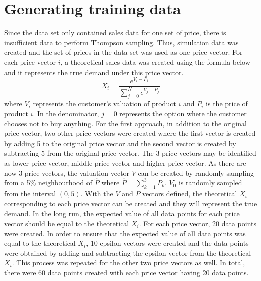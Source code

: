 \documentclass[a4paper]{article}
\begin{document}
\section{Generating training data}
\label{sec:theory}
Since the data set only contained sales data for one set of price, there is insufficient data to perform Thompson sampling. Thus, simulation data was created and the set of prices in the data set was used as one price vector. 
\newline
\newline
For each price vector $i$, a theoretical sales data was created using the formula below and it represents the true demand under this price vector.
\[X_i = \frac{e^{V_i - P_i}}{\sum_{j=0}^{N}e^{V_j - P_j}} \tag{1}\]
where $V_i$ represents the customer's valuation of product $i$ and $P_i$ is the price of product $i$. In the denominator, $j=0$ represents the option where the customer chooses not to buy anything. For the first approach, in addition to the original price vector, two other price vectors were created where the first vector is created by adding 5 to the original price vector and the second vector is created by subtracting 5 from the original price vector. The 3 price vectors may be identified as lower price vector, middle price vector and higher price vector.
\newline
\newline
As there are now 3 price vectors, the valuation vector $V$ can be created by randomly sampling from a 5\% neighbourhood of $\hat{P}$ where $\hat{P}=\sum_{k=1}^{3}P_k$. $V_0$ is randomly sampled from the interval $(0,5).$
\newline
\newline
With the $V$ and $P$ vectors defined, the theoretical $X_i$ corresponding to each price vector can be created and they will represent the true demand. In the long run, the expected value of all data points for each price vector should be equal to the theoretical $X_i$.
\newline
\newline
For each price vector, 20 data points were created. In order to ensure that the expected value of all data points was equal to the theoretical $X_i$, 10 epsilon vectors were created and the data points were obtained by adding and subtracting the epsilon vector from the theoretical $X_i$. This process was repeated for the other two price vectors as well. In total, there were 60 data points created with each price vector having 20 data points.
\end{document}
